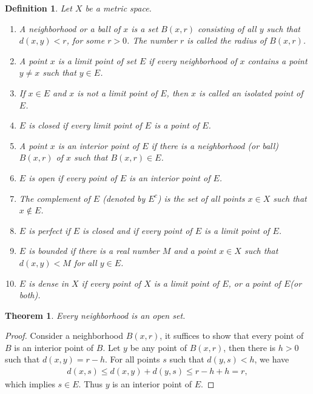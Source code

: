 \documentclass[10pt]{book}
\newtheorem{definition}{Definition}[chapter]
\newtheorem{theorem}{Theorem}[chapter]
\theoremstyle{definition}
\numberwithin{equation}{chapter}
\begin{document}
\medskip

\begin{definition}
Let $X$ be a metric space. 
\begin{enumerate}[label=(\alph*)]
    \item A neighborhood or a ball of $x$ is a set $B(x,r)$ consisting of all $y$ such that $d(x,y) < r$, for some $r > 0$. The number $r$ is called the radius of $B(x,r)$.
    
    \item A point $x$ is a limit point of set $E$ if every neighborhood of $x$ contains a point $y \neq x$ such that $y \in E$.
    
    \item If $x\in E$ and $x$ is not a limit point of $E$, then $x$ is called an isolated point of $E$.
    
    \item $E$ is closed if every limit point of $E$ is a point of $E$.
    
    \item A point $x$ is an interior point of $E$ if there is a neighborhood (or ball) $B(x,r)$ of $x$ such that $B(x,r) \in E$.
    
    \item $E$ is open if every point of $E$ is an interior point of $E$.
    
    \item The complement of $E$ (denoted by $E^c$) is the set of all points $x\in X$ such that $x\notin E$.
    
    \item $E$ is perfect if $E$ is closed and if every point of $E$ is a limit point of $E$.
    
    \item $E$ is bounded if there is a real number $M$ and a point $x\in X$ such that $d(x, y) < M$ for all $y\in E$.
    
    \item $E$ is dense in $X$ if every point of $X$ is a limit point of $E$, or a point of $E$(or both).
\end{enumerate}
\end{definition}

\medskip

\begin{theorem}
Every neighborhood is an open set.
\end{theorem}
\begin{proof}
Consider a neighborhood $B(x,r)$, it suffices to show that every point of $B$ is an interior point of $B$. Let $y$ be any point of $B(x,r)$, then there is $h > 0$ such that $d(x,y) = r - h$. For all points $s$ such that $d(y,s) < h$, we have
\begin{align*}
    d(x,s) \leq d(x,y) + d(y,s) \leq r - h + h = r,
\end{align*}
which implies $s \in E$. Thus $y$ is an interior point of $E$.
\end{proof}
\end{document}
